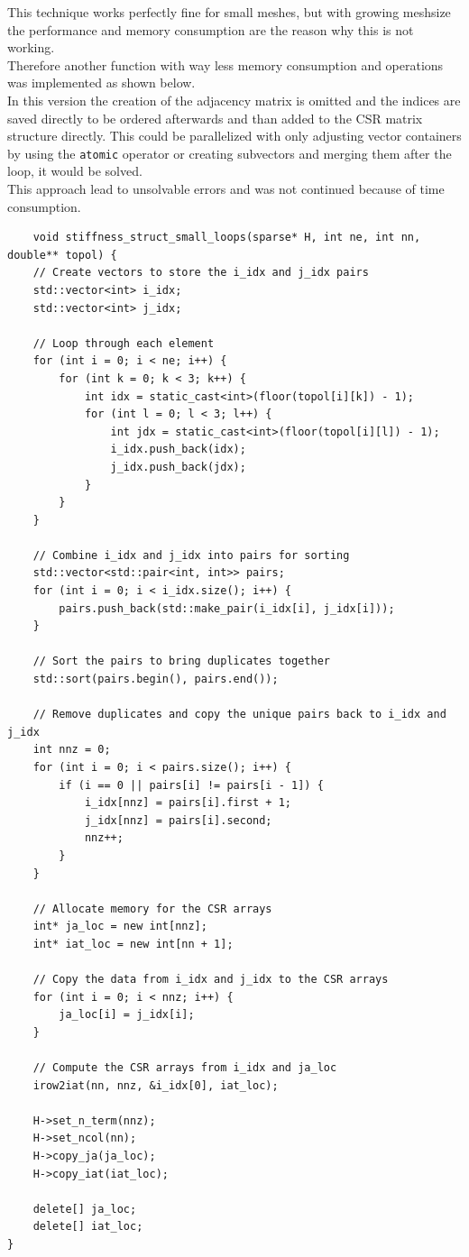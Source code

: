 \documentclass{article}
\begin{document}
This technique works perfectly fine for small meshes, but with growing meshsize the performance and memory consumption are the reason why this is not working.\\
Therefore another function with way less memory consumption and operations was implemented as shown below.\\
In this version the creation of the adjacency matrix is omitted and the indices are saved directly to be ordered afterwards and than added to the CSR matrix structure directly. This could be parallelized with only adjusting vector containers by using the \texttt{atomic} operator or creating subvectors and merging them after the loop, it would be solved.\\
This approach lead to unsolvable errors and was not continued because of time consumption.
\begin{verbatim}
	void stiffness_struct_small_loops(sparse* H, int ne, int nn, double** topol) {
    // Create vectors to store the i_idx and j_idx pairs
    std::vector<int> i_idx;
    std::vector<int> j_idx;
    
    // Loop through each element
    for (int i = 0; i < ne; i++) {
        for (int k = 0; k < 3; k++) {
            int idx = static_cast<int>(floor(topol[i][k]) - 1);
            for (int l = 0; l < 3; l++) {
                int jdx = static_cast<int>(floor(topol[i][l]) - 1);
                i_idx.push_back(idx);
                j_idx.push_back(jdx);
            }
        }
    }
    
    // Combine i_idx and j_idx into pairs for sorting
    std::vector<std::pair<int, int>> pairs;
    for (int i = 0; i < i_idx.size(); i++) {
        pairs.push_back(std::make_pair(i_idx[i], j_idx[i]));
    }
    
    // Sort the pairs to bring duplicates together
    std::sort(pairs.begin(), pairs.end());
    
    // Remove duplicates and copy the unique pairs back to i_idx and j_idx
    int nnz = 0;
    for (int i = 0; i < pairs.size(); i++) {
        if (i == 0 || pairs[i] != pairs[i - 1]) {
            i_idx[nnz] = pairs[i].first + 1;
            j_idx[nnz] = pairs[i].second;
            nnz++;
        }
    }
    
    // Allocate memory for the CSR arrays
    int* ja_loc = new int[nnz];
    int* iat_loc = new int[nn + 1];
    
    // Copy the data from i_idx and j_idx to the CSR arrays
    for (int i = 0; i < nnz; i++) {
        ja_loc[i] = j_idx[i];
    }
    
    // Compute the CSR arrays from i_idx and ja_loc
    irow2iat(nn, nnz, &i_idx[0], iat_loc);
    
    H->set_n_term(nnz);
    H->set_ncol(nn);
    H->copy_ja(ja_loc);
    H->copy_iat(iat_loc);

    delete[] ja_loc;
    delete[] iat_loc;
}

	
\end{verbatim}
\end{document}
